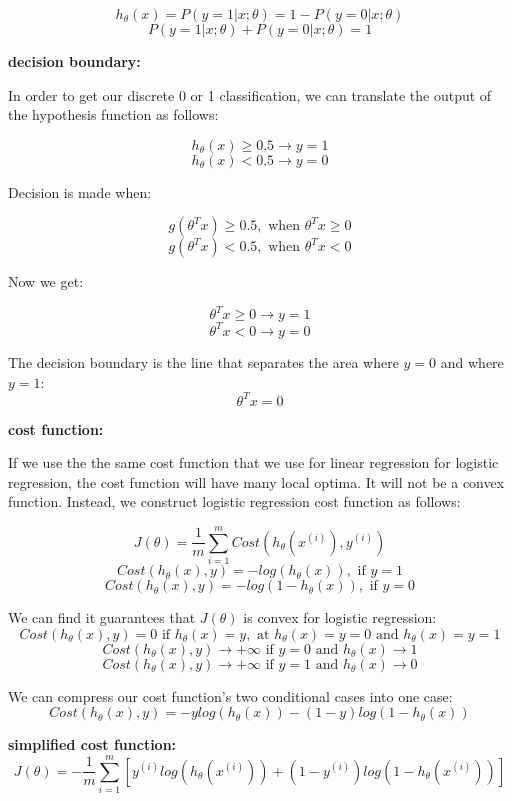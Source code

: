 \documentclass{article}
\begin{document}
\[
h_{\theta} (x) 
= P(y = 1 | x ; \theta)
= 1 - P(y = 0 | x ; \theta)
\]
\[P(y = 1 | x ; \theta) + P(y = 0 | x ; \theta) = 1\]

\noindent \textbf{decision boundary:}

\noindent In order to get our discrete 0 or 1 classification, we can translate the output of the hypothesis function as follows:

\[h_{\theta} (x) \geq 0.5 \rightarrow y = 1\]
\[h_{\theta} (x) < 0.5 \rightarrow y = 0\]

\noindent Decision is made when:

\[g(\theta^T x) \geq 0.5, \text{ when } \theta^T x \geq 0\]
\[g(\theta^T x) < 0.5, \text{ when } \theta^T x < 0\]

\noindent Now we get:

\[\theta^T x \geq 0 \rightarrow y = 1\]
\[\theta^T x < 0 \rightarrow y = 0\]

\noindent The decision boundary is the line that separates the area where \(y = 0\) and where \(y = 1\):
\[\theta^T x = 0\]

\noindent \textbf{cost function:}

\noindent If we use the the same cost function that we use for linear regression for logistic regression, the cost function will have many local optima. It will not be a convex function. Instead, we construct logistic regression cost function as follows:

\[J(\theta) = \frac{1}{m} \sum_{i = 1}^m Cost(h_{\theta}(x^{(i)}), y^{(i)})\]
\[Cost(h_{\theta}(x), y) = -log(h_{\theta}(x)), \text{ if } y = 1\]
\[Cost(h_{\theta}(x), y) = -log(1 - h_{\theta}(x)), \text{ if } y = 0\]

\noindent We can find it guarantees that \(J(\theta)\) is convex for logistic regression:
\[
Cost(h_{\theta}(x), y) = 0 \text{ if }
h_{\theta}(x) = y, \text{ at } h_{\theta}(x) = y = 0 \text{ and } 
h_{\theta}(x) = y = 1
\]
\[
Cost(h_{\theta}(x), y) \rightarrow +\infty
\text{ if } y = 0 \text{ and }
h_{\theta}(x) \rightarrow 1
\]
\[
Cost(h_{\theta}(x), y) \rightarrow +\infty
\text{ if } y = 1 \text{ and }
h_{\theta}(x) \rightarrow 0
\]

\noindent We can compress our cost function's two conditional cases into one case:
\[Cost(h_{\theta} (x), y) 
= - y log(h_{\theta} (x)) - (1 - y) log(1 - h_{\theta} (x))\]

\noindent \textbf{simplified cost function:}
\[J(\theta) = - \frac{1}{m} \sum_{i = 1}^{m} [y^{(i)} log(h_{\theta} (x^{(i)})) + (1 - y^{(i)}) log(1 - h_{\theta} (x^{(i)}))]\]
\end{document}
